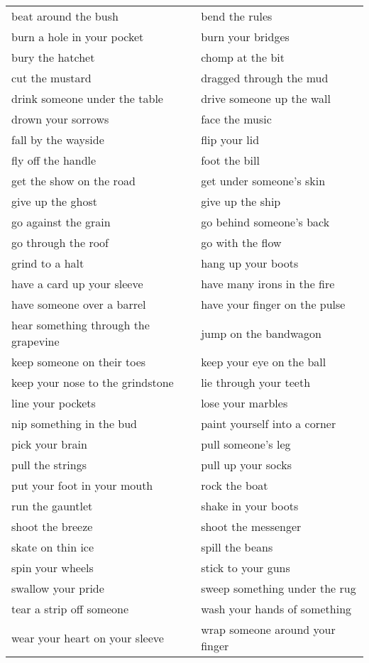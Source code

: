 \documentclass[output=paper
,modfonts
,nonflat]{langsci/langscibook}
\begin{document}
\begin{table}
\begin{tabular}{ll}
beat around the bush & bend the rules\\
burn a hole in your pocket & burn your bridges\\
bury the hatchet & chomp at the bit\\
cut the mustard & dragged through the mud\\
drink someone under the table & drive someone up the wall\\
drown your sorrows & face the music\\
fall by the wayside & flip your lid\\
fly off the handle & foot the bill\\
get the show on the road & get under someone's skin\\
give up the ghost & give up the ship\\
go against the grain & go behind someone's back\\
go through the roof & go with the flow\\
grind to a halt & hang up your boots\\
have a card up your sleeve & have many irons in the fire\\
have someone over a barrel & have your finger on the pulse\\
hear something through the grapevine & jump on the bandwagon\\
keep someone on their toes & keep your eye on the ball\\
keep your nose to the grindstone & lie through your teeth\\
line your pockets & lose your marbles\\
nip something in the bud & paint yourself into a corner\\
pick your brain & pull someone's leg\\
pull the strings & pull up your socks\\
put your foot in your mouth & rock the boat\\
run the gauntlet & shake in your boots\\
shoot the breeze & shoot the messenger\\
skate on thin ice & spill the beans\\
spin your wheels & stick to your guns\\
swallow your pride & sweep something under the rug\\
tear a strip off someone & wash your hands of something\\
wear your heart on your sleeve & wrap someone around your finger\\
\end{tabular}
\end{table}




\printbibliography
\end{document}

